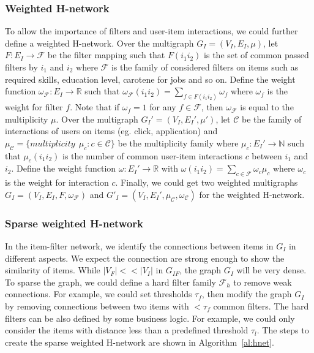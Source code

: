 \documentclass[manuscript,screen,review]{acmart}
\newcommand\Fcal{\mathcal{F}}
\begin{document}
\subsubsection{Weighted H-network} To allow the importance of filters and user-item interactions, we could further define a weighted H-network.
Over the multigraph $G_I=(V_I,E_I,\mu)$, let $F:E_I\to \mathcal{F}$ be the filter mapping such that $F(i_1i_2)$ is the set of common passed filters by $i_1$ and $i_2$ where $\mathcal{F}$ is the family of considered filters on items such as required skills, education level, carotene for jobs and so on. Define the weight function $\omega_\mathcal{F}: E_I\to\mathbb{R}$ such that $\omega_\mathcal{F}(i_1i_2)=\sum_{f\in F(i_1i_2)}\omega_f$ where $\omega_f$ is the weight for filter $f$. Note that if $\omega_f=1$ for any $f\in\mathcal{F}$, then $\omega_\mathcal{F}$ is equal to the multiplicity $\mu$. Over the multigraph $G_I'=(V_I,E_I',\mu')$, 
let $\mathcal{C}$ be the family of interactions of users on items (eg. click, application) and $\mu_{\mathcal{C}}=\{multiplicity\ \ \mu_c: c\in\mathcal{C}\}$ be the multiplicity family where $\mu_c: E_I'\to\mathbb{N}$ such that $\mu_c(i_1i_2)$ is the number of common user-item interactions $c$ between $i_1$ and $i_2$. Define the weight function $\omega: E_I'\to\mathbb{R}$ with $\omega(i_1i_2)=\sum_{c\in\mathcal{F}}\omega_c\mu_c$ where $\omega_c$ is the weight for interaction $c$. Finally, we could get two weighted multigraphs $G_I=(V_I,E_I,F,\omega_{\mathcal{F}})$ and $G'_I=(V_I,E_I',\mu_{\mathcal{C}},\omega_{\mathcal{C}})$ for the weighted H-network.

\subsubsection{Sparse weighted H-network} In the item-filter network, we identify the connections between items in $G_I$ in different aspects. We expect the connection are strong enough to show the similarity of items. While $|V_F|<<|V_I|$ in $G_{IF}$, the graph $G_{I}$ will be very dense. To sparse the graph, we could define a hard filter family $\Fcal_h$ to remove weak connections. For example, we could set thresholds $\tau_f$, then modify the graph $G_{I}$ by removing connections between two items with $<\tau_f$ common filters. The hard filters can be also defined by some business logic. For example, we could only consider the items with distance less than a predefined threshold $\tau_l$. The steps to create the sparse weighted H-network are shown in Algorithm~\ref{al:hnet}. 
\end{document}
